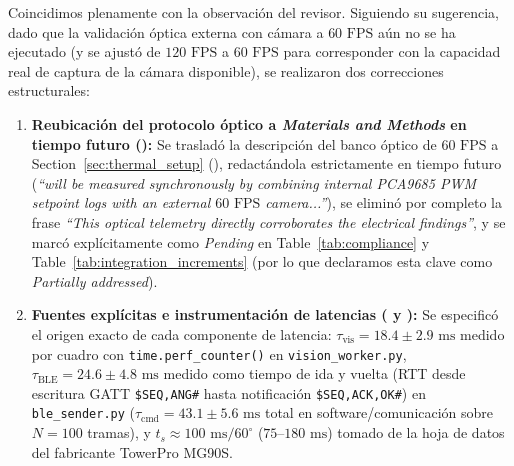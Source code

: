 \documentclass{LabDSTresponse}
\begin{document}
{Coincidimos plenamente con la observación del revisor. Siguiendo su sugerencia, dado que la validación óptica externa con cámara a $60\text{ FPS}$ aún no se ha ejecutado (y se ajustó de $120\text{ FPS}$ a $60\text{ FPS}$ para corresponder con la capacidad real de captura de la cámara disponible), se realizaron dos correcciones estructurales:
\begin{enumerate}
    \item \textbf{Reubicación del protocolo óptico a \textit{Materials and Methods} en tiempo futuro ():} Se trasladó la descripción del banco óptico de $60\text{ FPS}$ a Section~\ref{sec:thermal_setup} (), redactándola estrictamente en tiempo futuro (\textit{``will be measured synchronously by combining internal PCA9685 PWM setpoint logs with an external $60\text{ FPS}$ camera...''}), se eliminó por completo la frase \textit{``This optical telemetry directly corroborates the electrical findings''}, y se marcó explícitamente como \textit{Pending} en Table~\ref{tab:compliance} y Table~\ref{tab:integration_increments} (por lo que declaramos esta clave como \textit{Partially addressed}).
    \item \textbf{Fuentes explícitas e instrumentación de latencias ( y ):} Se especificó el origen exacto de cada componente de latencia: $\tau_{\text{vis}} = 18.4 \pm 2.9\text{ ms}$ medido por cuadro con \texttt{time.perf\_counter()} en \texttt{vision\_worker.py}, $\tau_{\text{BLE}} = 24.6 \pm 4.8\text{ ms}$ medido como tiempo de ida y vuelta (RTT desde escritura GATT \texttt{\$SEQ,ANG\#} hasta notificación \texttt{\$SEQ,ACK,OK\#}) en \texttt{ble\_sender.py} ($\tau_{\text{cmd}} = 43.1 \pm 5.6\text{ ms}$ total en software/comunicación sobre $N = 100$ tramas), y $t_s \approx 100\text{ ms}/60^\circ$ ($75\text{--}180\text{ ms}$) tomado de la hoja de datos del fabricante TowerPro MG90S.
\end{enumerate}}
\end{document}
